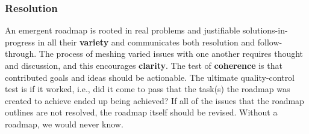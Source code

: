 \subsubsection*{Resolution}
An emergent roadmap is rooted in real problems and justifiable
solutions-in-progress in all their \textbf{variety} and communicates
both resolution and follow-through.  The process of meshing varied
issues with one another requires thought and discussion, and this
encourages \textbf{clarity}.  The test of \textbf{coherence} is that
contributed goals and ideas should be actionable.
%
The ultimate quality-control test is if it worked, i.e., did it come to pass that the task(s) the roadmap was created to achieve ended up being achieved?  If all of the issues that the roadmap outlines are not resolved, the roadmap itself should be revised. Without a roadmap, we would never know.

